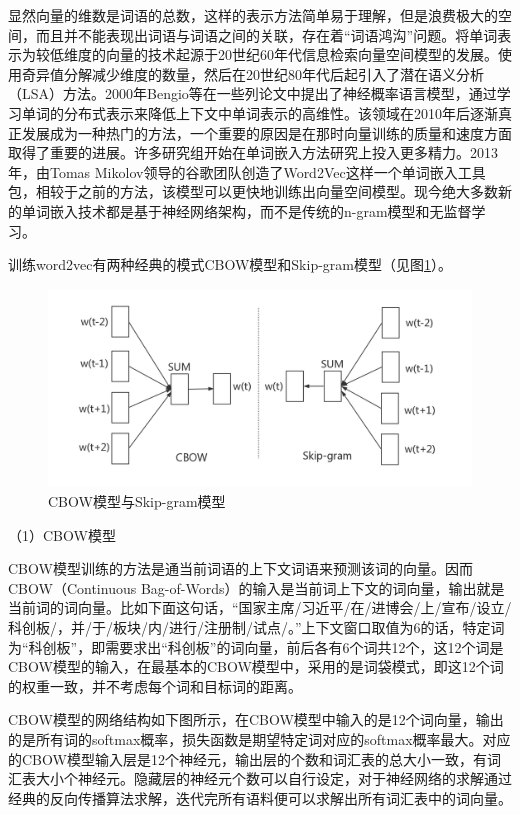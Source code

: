 \documentclass[winfonts,master,oneside,nobackinfo]{njuthesis}
\begin{document}
显然向量的维数是词语的总数，这样的表示方法简单易于理解，但是浪费极大的空间，而且并不能表现出词语与词语之间的关联，存在着“词语鸿沟”问题。将单词表示为较低维度的向量的技术起源于20世纪60年代信息检索向量空间模型的发展。使用奇异值分解减少维度的数量，然后在20世纪80年代后起引入了潜在语义分析（LSA）方法。2000年Bengio等\cite{Bengio}在一些列论文中提出了神经概率语言模型，通过学习单词的分布式表示来降低上下文中单词表示的高维性。该领域在2010年后逐渐真正发展成为一种热门的方法，一个重要的原因是在那时向量训练的质量和速度方面取得了重要的进展。许多研究组开始在单词嵌入方法研究上投入更多精力。2013年，由Tomas Mikolov领导的谷歌团队创造了Word2Vec这样一个单词嵌入工具包\cite{word2vec}，相较于之前的方法，该模型可以更快地训练出向量空间模型。现今绝大多数新的单词嵌入技术都是基于神经网络架构，而不是传统的n-gram模型和无监督学习。

训练word2vec有两种经典的模式CBOW模型和Skip-gram模型（见图\ref{cbow-skip}）。

\begin{figure}[h]
\centering
\includegraphics[width=	1\textwidth]{./figure/CBOW模型.jpg}
\caption{CBOW模型与Skip-gram模型}
\label{cbow-skip}
\end{figure}

（1）CBOW模型

CBOW模型训练的方法是通当前词语的上下文词语来预测该词的向量。因而CBOW（Continuous Bag-of-Words）的输入是当前词上下文的词向量，输出就是当前词的词向量。比如下面这句话，“国家主席/习近平/在/进博会/上/宣布/设立/科创板/，并/于/板块/内/进行/注册制/试点/。”上下文窗口取值为6的话，特定词为“科创板”，即需要求出“科创板”的词向量，前后各有6个词共12个，这12个词是CBOW模型的输入，在最基本的CBOW模型中，采用的是词袋模式，即这12个词的权重一致，并不考虑每个词和目标词的距离。

CBOW模型的网络结构如下图所示，在CBOW模型中输入的是12个词向量，输出的是所有词的softmax概率，损失函数是期望特定词对应的softmax概率最大。对应的CBOW模型输入层是12个神经元，输出层的个数和词汇表的总大小一致，有词汇表大小个神经元。隐藏层的神经元个数可以自行设定，对于神经网络的求解通过经典的反向传播算法求解，迭代完所有语料便可以求解出所有词汇表中的词向量。
\end{document}
